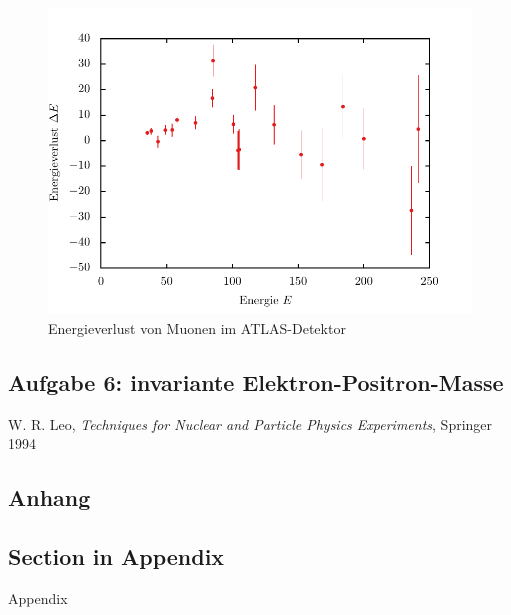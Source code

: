 \documentclass[11pt, a4paper]{article}
\numberwithin{equation}{section}
\begin{document}
\begin{figure}[h]
	\centering
	\includegraphics{./figures/muon_energy_loss/energy.pdf}
	\caption{Energieverlust von Muonen im ATLAS-Detektor}
\end{figure}

\subsection{Aufgabe 6: invariante Elektron-Positron-Masse}

\FloatBarrier
\vspace{\fill}
\begin{thebibliography}{19}
	W. R. Leo,
	\emph{Techniques for Nuclear and Particle Physics Experiments},
	Springer 1994

\end{thebibliography}

\begin{appendix}
\newpage
\section{Anhang}

\FloatBarrier
\subsection{Section in Appendix}
Appendix
\FloatBarrier

\end{appendix}
\end{document}
